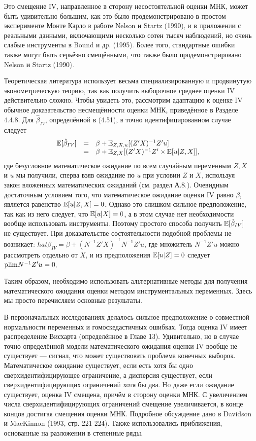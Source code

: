 Это смещение IV, направленное в сторону несостоятельной оценки МНК, может быть удивительно большим, как это было продемонстрировано в простом эксперименте Монте Карло в работе Nelson и Startz (1990), и в приложении с реальными данными, включающими несколько сотен тысяч наблюдений, но очень слабые инструменты в Bound и др. (1995). Более того, стандартные ошибки также могут быть серьёзно смещёнными, что также было продемонстрировано  Nelson и Startz (1990).

Теоретическая литература использует весьма специализированную и продвинутую эконометрическую теорию, так как получить выборочное среднее оценки IV действительно сложно. Чтобы увидеть это, рассмотрим адаптацию к оценке IV обычное доказательство несмещённости оценки МНК, приведённое в Разделе 4.4.8. Для $\hat{\beta}_{IV}$, определённой в (4.51), в точно идентифицированном случае следует
\[
\begin{array}{rcl}
\mathbb{E}[\hat{\beta}_{IV}] & = & \beta + \mathbb{E}_{Z,X,u}[(Z'X)^{-1}Z'u] \\
& = &  \beta + \mathbb{E}_{Z,X}[(Z'X)^{-1}Z' \times \mathbb{E}[u|Z,X]],
\end{array}
\]
где безусловное математическое ожидание по всем случайным переменным $Z, X$ и $u$ мы получили, сперва взяв ожидание по $u$ при условии $Z$ и $X$, используя закон вложенных математических ожиданий (см. раздел А.8.). Очевидным достаточным условием того, что математическое ожидание оценки IV равно $\beta$, является равенство $\mathbb{E}[u|Z,X]=0$. Однако это слишком сильное предположение, так как из него следует, что $\mathbb{E}[u|X]=0$, а в этом случае нет необходимости вообще использовать инструменты. Поэтому простого способа получить $\mathbb{E}[\hat{\beta}_{IV}]$ не существует. При доказательстве состоятельности подобной проблемы не возникает: $hat{\beta}_{IV} = \beta +(N^{-1}Z'X)^{-1}N^{-1}Z'u$, где множитель $N^{-1}Z'u$ можно рассмотреть отдельно от $X$, и из предположения $\mathbb{E}[u|Z]=0$ следует $\mathrm{plim } N^{-1}Z'u=0$.

Таким образом, необходимо использовать альтернативные методы для получения математического ожидания оценки методом инструментальных переменных. Здесь мы просто перечисляем основные результаты.

В первоначальных исследованиях делалось сильное предположение о совместной нормальности переменных и гомоскедастичных ошибках. Тогда оценка IV имеет распределение Висхарта (определённое в Главе 13). Удивительно, но в случае точно определённой модели математического ожидания оценки IV вообще не существует --- сигнал, что может существовать проблема конечных выборок. Математическое ожидание существует, если есть хотя бы одно сверхидентифицирующее ограничение, а дисперсия существует, если сверхидентифицирующих ограничений хотя бы два. Но даже если ожидание существует, оценка IV смещена, причём в сторону оценки МНК. С увеличением числа сверхидентифицирующих ограничений смещение увеличивается, в конце концов достигая смещения оценки МНК. Подробное обсуждение дано в Davidson и MacKinnon (1993, стр. 221-224). Также использовались приближения, основанные на разложении в степенные ряды.

